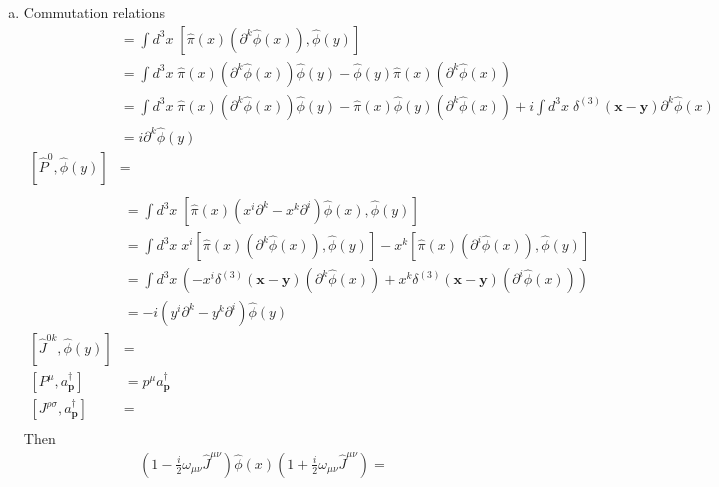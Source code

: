 \documentclass[10pt,a4paper]{report}
\theoremstyle{definition}
\begin{document}
\begin{enumerate}[a)]
\item Commutation relations
\begin{align}
[\hat{P}^k,\hat{\phi}(y)]
&=\int d^3x\;[\hat{\pi}(x)(\partial^k\hat{\phi}(x)),\hat{\phi}(y)]\\
&=\int d^3x\;\hat{\pi}(x)(\partial^k\hat{\phi}(x))\hat{\phi}(y)-\hat{\phi}(y)\hat{\pi}(x)(\partial^k\hat{\phi}(x))\\
&=\int d^3x\;\hat{\pi}(x)(\partial^k\hat{\phi}(x))\hat{\phi}(y)-\hat{\pi}(x)\hat{\phi}(y)(\partial^k\hat{\phi}(x))+i\int d^3x\;\delta^{(3)}(\mathbf{x}-\mathbf{y})\partial^k\hat{\phi}(x)\\
&=i\partial^k\hat{\phi}(y)\\
[\hat{P}^0,\hat{\phi}(y)]&=\\
\end{align}
\begin{align}
[\hat{J}^{ik},\hat{\phi}(y)]
&=\int d^3x\;[\hat{\pi}(x)(x^i\partial^k-x^k\partial^i)\hat{\phi}(x),\hat{\phi}(y)]\\
&=\int d^3x\;x^i[\hat{\pi}(x)(\partial^k\hat{\phi}(x)),\hat{\phi}(y)]-x^k[\hat{\pi}(x)(\partial^i\hat{\phi}(x)),\hat{\phi}(y)]\\
&=\int d^3x\,\left(-x^i\delta^{(3)}(\mathbf{x}-\mathbf{y})(\partial^k\hat{\phi}(x))+x^k\delta^{(3)}(\mathbf{x}-\mathbf{y})(\partial^i\hat{\phi}(x))\right)\\
&=-i(y^i\partial^k-y^k\partial^i)\hat{\phi}(y)\\
[\hat{J}^{0k},\hat{\phi}(y)]&=\\
[P^\mu,a^\dagger_\mathbf{p}]&=p^\mu a^\dagger_\mathbf{p}\\
[J^{\rho\sigma},a^\dagger_\mathbf{p}]&=\\
\end{align}
Then
\begin{align}
\left(1-\frac{i}{2}\omega_{\mu\nu}\hat{J}^{\mu\nu}\right)\hat{\phi}(x)\left(1+\frac{i}{2}\omega_{\mu\nu}\hat{J}^{\mu\nu}\right)=
\end{align}





\end{enumerate}
\end{document}

